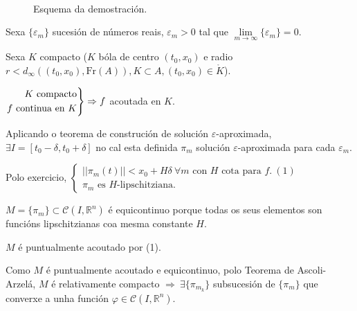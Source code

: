 \documentclass[11pt, a4paper,twoside]{article}
\makeatletter
\theoremstyle{theorem-style}  %
\renewenvironment{proof}[1][\proofname]{\par
	\pushQED{\qed}%
	\normalfont \topsep6\p@\@plus6\p@\relax
	\list{}{%
		\settowidth{\leftmargin}{\quad:\hskip\labelsep}%
		\setlength{\labelwidth}{0pt}%
		\setlength{\itemindent}{-\leftmargin}%
	}%
	\item[\hskip\labelsep\itshape#1\@addpunct{:}]\ignorespaces
}{%
	\popQED\endlist\@endpefalse
}
\theoremstyle{definition-style}
\theoremstyle{example-style}
\newenvironment{rcases}
{\left.\begin{aligned}}
	{\end{aligned}\right\rbrace}
\makeatother
\begin{document}
\begin{proof} \ \\
	\begin{figure}[h]
		\centering
		\caption{Esquema da demostración.} \label{M2}
	\end{figure}
	Sexa $ \{\varepsilon_m \} $ sucesión de números reais, $ \varepsilon_m>0  $ tal que $ \lim\limits_{m\to\infty} \{\varepsilon_m\} =0$.
	
	Sexa $ K $ compacto ($ K $ bóla de centro $ (t_0,x_0) $ e radio $ r<d_\infty((t_0,x_0), \text{Fr}(A)), K\subset A, (t_0,x_0) \in \mathring{K} $).
	
	$ \begin{rcases}
	K \text{ compacto}\\
	f \text{ continua en } K
	\end{rcases} \Rightarrow  f $ acoutada en $ K $.
	
	Aplicando o teorema de construción de solución $ \varepsilon $-aproximada, $ \exists I=[t_0-\delta, t_0+\delta] $ no cal esta definida $ \pi_m $ solución  $ \varepsilon $-aproximada para cada $ \varepsilon_m $.
	
	Polo exercicio, $ \begin{cases}
		||\pi_m(t)||< x_0+H\delta \ \forall m \text{ con } H \text{ cota para } f.\ (1)\\
		\pi_m \text{ es } H\text{-lipschitziana.}
	\end{cases} $
	
	$ M = \{\pi_m\} \subset  \mathcal{C} (I, \mathbb{R}^n)$ é equicontinuo porque todas os seus elementos son funcións lipschitzianas coa mesma constante $ H $.
	
	$ M $ é puntualmente acoutado por (1). 
	
	Como $ M $ é puntualmente acoutado e equicontinuo, polo Teorema de Ascoli-Arzelá, $ M$ é relativamente compacto $ \Rightarrow \ \exists \{\pi_{m_k}\}$ subsucesión de $ \{\pi_m\} $ que converxe a unha función $ \varphi\in \mathcal{C}(I, \mathbb{R}^n) $.
	

\end{proof}
\end{document}

